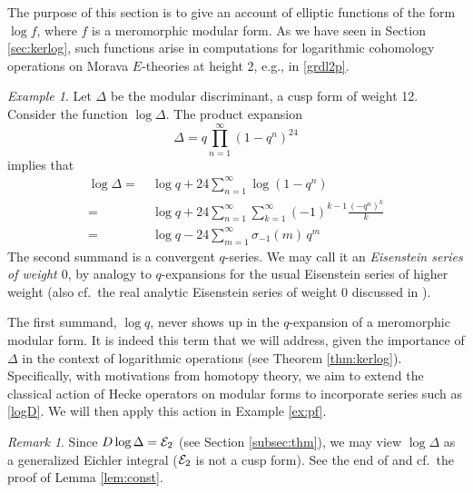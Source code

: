 \documentclass{gtpart}
\theoremstyle{definition}
\theoremstyle{remark}
\newtheorem{rmk}[thm]{Remark}
\newtheorem{ex}[thm]{Example}
\newcommand{\CE}{{\cal E}}
\renewcommand{\D}{\Delta}
\newcommand{\si}{\sigma}
\renewcommand{\=}{\approx}
\renewcommand{\-}{\sim}
\numberwithin{equation}{section}
\numberwithin{thm}{section}
\begin{document}
The purpose of this section is to give an account of elliptic functions of the 
form $\log f$, where $f$ is a meromorphic modular form.  As we have seen in 
Section \ref{sec:kerlog}, such functions arise in computations for logarithmic 
cohomology operations on Morava $E$-theories at height 2, e.g., in 
\eqref{grdl2p}.  

\begin{ex}
 \label{ex:logD}
 Let $\D$ be the modular discriminant, a cusp form of weight 12.  Consider the 
 function $\log \D$.  The product expansion 
 \[
  \D = q \prod_{n=1}^\infty (1 - q^n)^{24} 
 \]
 implies that 
 \begin{equation}
  \label{logD}
  \begin{split}
   \log \D = & ~ \log q + 24 \sum_{n = 1}^\infty \log(1 - q^n) \\
           = & ~ \log q + 24 \sum_{n = 1}^\infty \sum_{k = 1}^\infty 
               (-1)^{k - 1} \frac{(-q^n)^k}{k} \\
           = & ~ \log q - 24 \sum_{m = 1}^\infty \si_{-1}(m) \, q^{m} 
  \end{split}
 \end{equation}
 The second summand is a convergent $q$-series.  We may call it an 
 {\em Eisenstein series of weight $0$}, by analogy to $q$-expansions for the 
 usual Eisenstein series of higher weight (also cf.~the real analytic Eisenstein 
 series of weight 0 discussed in \cite[Sections 3.3 and 4.1]{Funke}).  

 The first summand, $\log q$, never shows up in the $q$-expansion of a 
 meromorphic modular form.  It is indeed this term that we will address, given 
 the importance of $\D$ in the context of logarithmic operations (see Theorem 
 \ref{thm:kerlog}).  Specifically, with motivations from homotopy theory, we aim 
 to extend the classical action of Hecke operators on modular forms to 
 incorporate series such as \eqref{logD}.  We will then apply this action in 
 Example \ref{ex:pf}.  
\end{ex}

\begin{rmk}
 \label{rmk:eichler}
 Since $D \log \D = \CE_2$ (see Section \ref{subsec:thm}), we may view $\log \D$ 
 as a generalized Eichler integral ($\CE_2$ is not a cusp form).  See the end of 
 \cite[\S 6]{mock} and cf.~the proof of Lemma \ref{lem:const}.  
\end{rmk}
\end{document}
